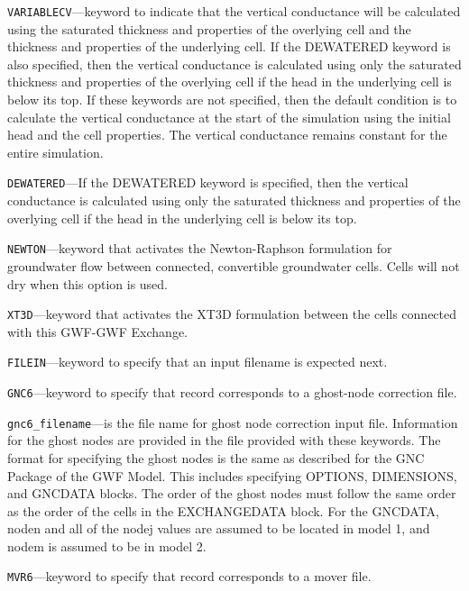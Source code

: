 \begin{description}
\item \texttt{VARIABLECV}---keyword to indicate that the vertical conductance will be calculated using the saturated thickness and properties of the overlying cell and the thickness and properties of the underlying cell.  If the DEWATERED keyword is also specified, then the vertical conductance is calculated using only the saturated thickness and properties of the overlying cell if the head in the underlying cell is below its top.  If these keywords are not specified, then the default condition is to calculate the vertical conductance at the start of the simulation using the initial head and the cell properties.  The vertical conductance remains constant for the entire simulation.

\item \texttt{DEWATERED}---If the DEWATERED keyword is specified, then the vertical conductance is calculated using only the saturated thickness and properties of the overlying cell if the head in the underlying cell is below its top.

\item \texttt{NEWTON}---keyword that activates the Newton-Raphson formulation for groundwater flow between connected, convertible groundwater cells. Cells will not dry when this option is used.

\item \texttt{XT3D}---keyword that activates the XT3D formulation between the cells connected with this GWF-GWF Exchange.

\item \texttt{FILEIN}---keyword to specify that an input filename is expected next.

\item \texttt{GNC6}---keyword to specify that record corresponds to a ghost-node correction file.

\item \texttt{gnc6\_filename}---is the file name for ghost node correction input file.  Information for the ghost nodes are provided in the file provided with these keywords.  The format for specifying the ghost nodes is the same as described for the GNC Package of the GWF Model.  This includes specifying OPTIONS, DIMENSIONS, and GNCDATA blocks.  The order of the ghost nodes must follow the same order as the order of the cells in the EXCHANGEDATA block.  For the GNCDATA, noden and all of the nodej values are assumed to be located in model 1, and nodem is assumed to be in model 2.

\item \texttt{MVR6}---keyword to specify that record corresponds to a mover file.


\end{description}

